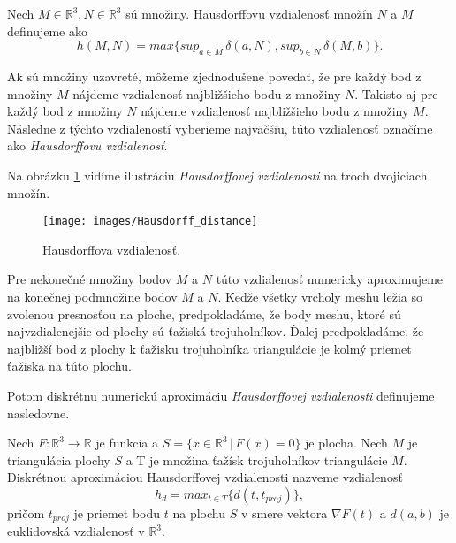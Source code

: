 \begin{enumerate}
{    \begin{definition}
        Nech $M \in \mathbb{R}^3, N \in \mathbb{R}^3$ sú množiny.
        Hausdorffovu vzdialenosť množín $N$ a $M$ definujeme ako
        \begin{equation}
            h(M, N) = max \big \{sup_{a \in M} \, \delta(a, N), sup_{b \in N} \, \delta(M, b) \big \}.
        \end{equation}
    \end{definition}

    Ak sú množiny uzavreté, môžeme zjednodušene povedať, že pre každý bod z množiny $M$ nájdeme 
    vzdialenosť najbližšieho bodu z množiny $N$.
    Takisto aj pre každý bod z množiny $N$ nájdeme vzdialenosť najbližšieho bodu z množiny $M$.
    Následne z týchto vzdialeností vyberieme najväčšiu, túto vzdialenosť označíme ako 
    \textit{Hausdorffovu vzdialenosť}.

    Na obrázku \ref{obr:hausdorff_distance} vidíme ilustráciu \textit{Hausdorffovej vzdialenosti} 
    na troch dvojiciach množín.

    \begin{figure}
        \centerline{\texttt{[image: images/Hausdorff\_distance]}}
        \caption[Hausdorffova vzdialenosť]{Hausdorffova vzdialenosť.}
        \label{obr:hausdorff_distance}
    \end{figure}


    Pre nekonečné množiny bodov $M$ a $N$ túto vzdialenosť numericky aproximujeme na konečnej 
    podmnožine bodov $M$ a $N$. Keďže všetky vrcholy meshu ležia so zvolenou presnosťou na ploche, 
    predpokladáme, že body meshu, ktoré sú najvzdialenejšie od plochy sú ťažiská trojuholníkov.
    Ďalej predpokladáme, že najbližší bod z plochy k ťažisku trojuholníka triangulácie
    je kolmý priemet ťažiska na túto plochu.

    Potom diskrétnu numerickú aproximáciu \textit{Hausdorffovej vzdialenosti} definujeme nasledovne.
    \begin{definition}
        Nech $F:\mathbb{R}^3 \to \mathbb{R}$ je funkcia a $S = \{x \in \mathbb{R}^3 \, | \, F(x)=0 \}$ 
        je plocha. Nech $M$ je triangulácia plochy $S$
        a T je množina ťažísk trojuholníkov triangulácie $M$.
        Diskrétnou aproximáciou Hausdorffovej vzdialenosti nazveme vzdialenosť
        \begin{equation}
            h_d = max_{t \in T} \big \{ d(t, t_{proj})\big \},
        \end{equation}
        pričom $t_{proj}$ je priemet bodu $t$ na plochu $S$ v smere vektora $\nabla F(t)$ a
        $d(a, b)$ je euklidovská vzdialenosť v $\mathbb{R}^3$.
    \end{definition}

}
\end{enumerate}
